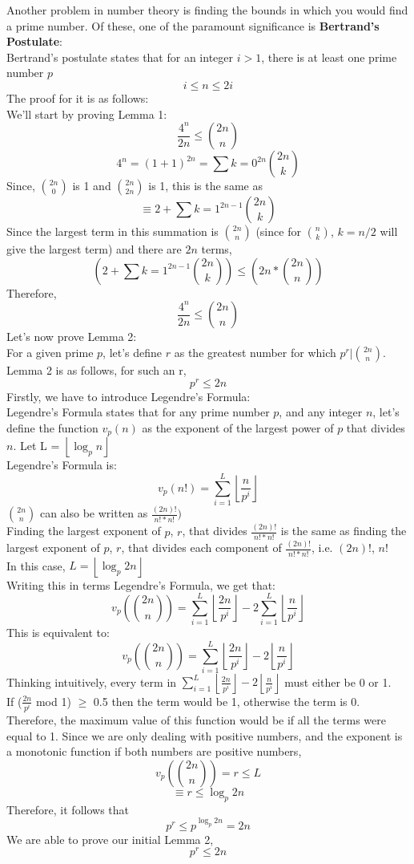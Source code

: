 \documentclass[12pt, letterpaper]{article}
\begin{document}
Another problem in number theory is finding the bounds in which you would find a prime number. Of these, one of the paramount significance is \textbf{Bertrand's Postulate}: \\
Bertrand's postulate states that for an integer $i > 1$, there is at least one prime number $p$
\[
    i \leq n \leq 2i 
\]
The proof for it is as follows:\\
We'll start by proving Lemma 1:\\
\[
    \frac{4^n}{2n} \leq {2n \choose n}
\]
\[
    4^n = (1 + 1)^{2n} = \sum{k = 0}^{2n} {2n \choose k} 
\]
Since, $2n \choose 0$ is 1 and $2n \choose 2n$ is 1, this is the same as
\[
    \equiv 2 + \sum{k = 1}^{2n - 1} {2n \choose k} 
\]
Since the largest term in this summation is $2n \choose n$ (since for $n \choose k$, $k = n/2$ will give the largest term) and there are $2n$ terms, 
\[
     (2 + \sum{k = 1}^{2n - 1} {2n \choose k}) \leq (2n * {2n \choose n})
\]
Therefore, 
\[
    \frac{4^n}{2n} \leq {2n \choose n}
\]
Let's now prove Lemma 2:\\
For a given prime $p$, let's define $r$ as the greatest number for which $p^r | {2n \choose n}$. Lemma 2 is as follows, for such an r, 
\[
    p^r \le 2n
\]
Firstly, we have to introduce Legendre's Formula:\\
Legendre's Formula states that for any prime number $p$, and any integer $n$, let's define the function $v_p(n)$ as the exponent of the largest power of $p$ that divides $n$. Let L = $\left\lfloor \log_{p}{n} \right\rfloor$\\
Legendre's Formula is:
\[
    v_{p}(n!) = \sum_{i = 1}^{L} {\left\lfloor \frac{n}{p^i} \right\rfloor}
\]
${2n \choose n}$ can also be written as $\frac{(2n)!}{n!*n!})$\\ Finding the largest exponent of $p$, $r$, that divides $\frac{(2n)!}{n!*n!}$ is the same as finding the largest exponent of $p$, $r$, that divides each component of $\frac{(2n)!}{n!*n!}$, i.e. $(2n)!$, $n!$\\

In this case, $L = \left\lfloor \log_{p}{2n} \right\rfloor$\\ Writing this in terms Legendre's Formula, we get that:
\[
    v_{p}({2n \choose n}) = \sum_{i = 1}^{L} {\left\lfloor \frac{2n}{p^i} \right\rfloor} - 2\sum_{i = 1}^{L} {\left\lfloor \frac{n}{p^i} \right\rfloor}
\]
This is equivalent to:
\[
    v_{p}({2n \choose n}) = \sum_{i = 1}^{L} {\left\lfloor \frac{2n}{p^i} \right\rfloor - 2\left\lfloor \frac{n}{p^i} \right\rfloor}
\]
Thinking intuitively, every term in $\sum_{i = 1}^{L} {\left\lfloor \frac{2n}{p^i} \right\rfloor - 2\left\lfloor \frac{n}{p^i} \right\rfloor}$ must either be 0 or 1.\\
If ($\frac{2n}{p^i}$ mod 1) $\geq$ 0.5 then the term would be 1, otherwise the term is 0. Therefore, the maximum value of this function would be if all the terms were equal to 1. Since we are only dealing with positive numbers, and the exponent is a monotonic function if both numbers are positive numbers,
\[
    v_{p}({2n \choose n}) = r \leq L
\]
\[
    \equiv r \le \log_{p}{2n}
\]
Therefore, it follows that
\[
    p^r \le p^{\log_{p}{2n}} = 2n
\]
We are able to prove our initial Lemma 2, 
\[
    p^r \le 2n
\]
\end{document}
